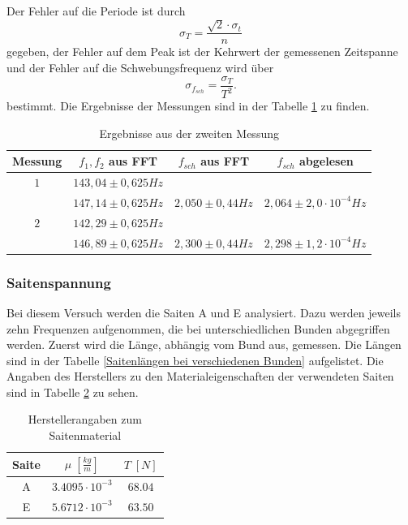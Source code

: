 \documentclass[a4paper, 11pt]{article}
\begin{document}
Der Fehler auf die Periode ist durch 
\begin{equation}
\sigma_T = \frac{\surd2 \cdot \sigma_t}{n}
\end{equation}
gegeben, der Fehler auf dem Peak ist der Kehrwert der gemessenen Zeitspanne und der Fehler auf die Schwebungsfrequenz wird über
\begin{equation}
\sigma_{f_{sch}} = \frac{\sigma_T}{T^2}. 
\end{equation}
bestimmt. Die Ergebnisse der Messungen sind in der Tabelle \ref{Tabelle 4} zu finden.
\begin{table}[H]
\centering
\renewcommand{\arraystretch}{1.2}
\begin{tabular}{|c|c|c|c|}
\hline Messung & $f_1,f_2$ aus FFT & $f_{sch}$ aus FFT & $f_{sch}$ abgelesen \\
\hline $1$ & $143,04 \pm 0,625 Hz$ & & \\
           & $147,14 \pm 0,625 Hz$ & $2,050 \pm 0,44 Hz$ & $2,064 	\pm 2,0 \cdot 10^{-4} Hz $ \\
\hline $2$ & $142,29 \pm 0,625 Hz$ &  &    \\
 		& $146,89 \pm 0,625 Hz$ & $2,300 \pm 0,44 Hz$  & $2,298 \pm 1,2 \cdot 10^{-4} Hz$ \\
\hline
\end{tabular}
\caption{Ergebnisse aus der zweiten Messung}
\label{Tabelle 4}
\end{table}


\subsubsection{Saitenspannung}
Bei diesem Versuch werden die Saiten A und E analysiert. Dazu werden jeweils zehn Frequenzen aufgenommen, die bei unterschiedlichen Bunden abgegriffen werden. Zuerst wird die Länge, abhängig vom Bund aus, gemessen. Die Längen sind in der Tabelle \ref{Saitenlängen bei verschiedenen Bunden} aufgelistet.
Die Angaben des Herstellers zu den Materialeigenschaften der verwendeten Saiten sind in Tabelle \ref{table:Saitenmaterial} zu sehen.

\begin{table}[H]
	\centering
	\renewcommand{\arraystretch}{1.2}
	\begin{tabular}{|c|c|c|}
		\hline
		Saite & $\mu \;[\frac{kg}{m}]$ & $T \;[N]$  \\
		\hline 
		A & $3.4095 \cdot 10^{-3}$ & $68.04$ \\
		E & $5.6712 \cdot 10^{-3}$ & $63.50$\\
		\hline
	\end{tabular}
	\caption{Herstellerangaben zum Saitenmaterial}
	\label{table:Saitenmaterial}
\end{table}
\end{document}
